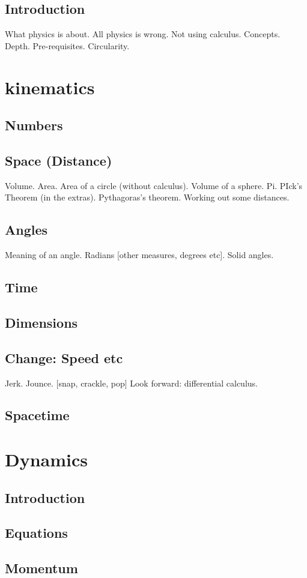 \documentclass[main.tex]{subfiles}
\begin{document}
\chapter{Introduction}
What physics is about. All physics is wrong.
Not using calculus. Concepts. Depth. Pre-requisites. Circularity.
\part{kinematics}
\chapter{Numbers}
\chapter{Space (Distance)}
Volume. Area. Area of a circle (without calculus). Volume of a sphere. Pi. PIck's Theorem (in the extras). Pythagoras's theorem. Working out some distances.
\chapter{Angles}
Meaning of an angle. Radians [other measures, degrees etc]. Solid angles.
\chapter{Time}
\chapter{Dimensions}
\chapter{Change: Speed etc}
Jerk. Jounce. [snap, crackle, pop]
Look forward: differential calculus.
\chapter{Spacetime}
\part{Dynamics}
\chapter{Introduction}
\chapter{Equations}
\chapter{Momentum}
\end{document}
